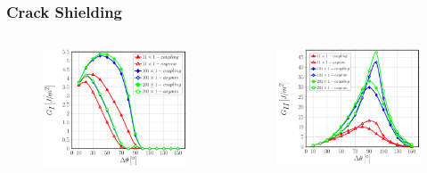 \documentclass[first,firstsupp,lastsupp,last,hyperref,table]{ETHclass}
\begin{document}
\begin{frame}
\frametitle{\vspace{0.2cm}\small Crack Shielding}
\vspace{-1cm}
\centering
\begin{columns}[c]
\centering
\begin{column}{0.5\textwidth}
\centering
\begin{figure}
\centering
\includegraphics[width=\columnwidth]{nx1-coupling-vf60-GI-crackshield11.pdf}
\end{figure}
\end{column}
\begin{column}{0.5\textwidth}
\centering
\begin{figure}
\centering
\includegraphics[width=\columnwidth]{nx1-coupling-vf60-GII-crackshield11.pdf}

\end{figure}
\end{column}
\end{columns}
\end{frame}
\end{document}

